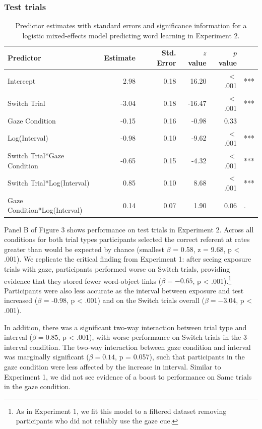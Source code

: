 \documentclass[authoryear, review]{elsarticle}
\begin{document}
\subsubsection{Test trials}\label{test-trials-1}

\begin{table}[tb]
\centering
\begin{tabular}{lrrrrl}
 Predictor & Estimate & Std. Error & $z$ value & $p$ value &  \\ 
  \hline
Intercept & 2.98 & 0.18 & 16.20 & $<$ .001 & *** \\ 
  Switch Trial & -3.04 & 0.18 & -16.47 & $<$ .001 & *** \\ 
  Gaze Condition & -0.15 & 0.16 & -0.98 & 0.33 &  \\ 
  Log(Interval) & -0.98 & 0.10 & -9.62 & $<$ .001 & *** \\ 
  Switch Trial*Gaze Condition & -0.65 & 0.15 & -4.32 & $<$ .001 & *** \\ 
  Switch Trial*Log(Interval) & 0.85 & 0.10 & 8.68 & $<$ .001 & *** \\ 
  Gaze Condition*Log(Interval) & 0.14 & 0.07 & 1.90 & 0.06 & . \\ 
   \hline
\end{tabular}
\caption{Predictor estimates with standard errors and significance information for a logistic mixed-effects model predicting word learning in Experiment 2.} 
\label{tab:exp2_reg}
\end{table}

Panel B of Figure 3 shows performance on test trials in Experiment 2.
Across all conditions for both trial types participants selected the
correct referent at rates greater than would be expected by chance
(smallest \(\beta\) = 0.58, z = 9.68, p \textless{} .001). We replicate
the critical finding from Experiment 1: after seeing exposure trials
with gaze, participants performed worse on Switch trials, providing
evidence that they stored fewer word-object links (\(\beta = -0.65\), p
\textless{}
.001).\footnote{As in Experiment 1, we fit this model to a filtered dataset removing participants who did not reliably use the gaze cue.}
Participants were also less accurate as the interval between exposure
and test increased (\(\beta\) = -0.98, p \textless{} .001) and on the
Switch trials overall (\(\beta = -3.04\), p \textless{} .001).

In addition, there was a significant two-way interaction between trial
type and interval (\(\beta = 0.85\), p \textless{} .001), with worse
performance on Switch trials in the 3-interval condition. The two-way
interaction between gaze condition and interval was marginally
significant (\(\beta = 0.14\), p = 0.057), such that participants in the
gaze condition were less affected by the increase in interval. Similar
to Experiment 1, we did not see evidence of a boost to performance on
Same trials in the gaze condition.
\end{document}
